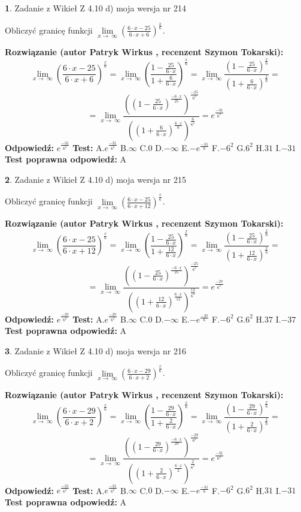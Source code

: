 \documentclass[12pt, a4paper]{article}
\theoremstyle{definition} %
\newtheorem{zad}{}
\newcommand{\zadStart}[1]{\begin{zad}#1\newline}
\newcommand{\zadStop}{\end{zad}}
\newcommand{\rozwStart}[2]{\noindent \textbf{Rozwiązanie (autor #1 , recenzent #2): }\newline}
\newcommand{\rozwStop}{\newline}
\newcommand{\odpStart}{\noindent \textbf{Odpowiedź:}\newline}
\newcommand{\odpStop}{\newline}
\newcommand{\testStart}{\noindent \textbf{Test:}\newline}
\newcommand{\testStop}{\newline}
\newcommand{\kluczStart}{\noindent \textbf{Test poprawna odpowiedź:}\newline}
\newcommand{\kluczStop}{\newline}
\begin{document}
\zadStart{Zadanie z Wikieł Z 4.10 d) moja wersja nr 214}


Obliczyć granicę funkcji  $\lim\limits_{x\to\ \infty}(\frac{6\cdot x-25}{6\cdot x+6})^{\frac{x}{6}}$.
\zadStop
\rozwStart{Patryk Wirkus}{Szymon Tokarski}
$$\lim\limits_{x\to\ \infty}(\frac{6\cdot x-25}{6\cdot x+6})^{\frac{x}{6}} = \lim\limits_{x\to\ \infty}(\frac{1-\frac{25}{6\cdot x}}{1+\frac{6}{6\cdot x}})^{\frac{x}{6}}=\lim\limits_{x\to\ \infty}\frac{(1-\frac{25}{6\cdot x})^{\frac{x}{6}}}{(1+\frac{6}{6\cdot x})^{\frac{x}{6}}}=$$
$$=\lim\limits_{x\to\ \infty}\frac{((1-\frac{25}{6\cdot x})^{\frac{-6\cdot x}{25}})^{\frac{-25}{6^{2}}}}{((1+\frac{6}{6\cdot x})^{\frac{6\cdot x}{6}})^{\frac{6}{6^{2}}}}=e^{\frac{-31}{6^{2}}}$$
\rozwStop
\odpStart
$e^{\frac{-31}{6^{2}}}$
\odpStop
\testStart
A.$e^{\frac{-31}{6^{2}}}$ B.$\infty$ C.$0$ D.$-\infty$ E.$-e^{\frac{-31}{6}}$
F.$-6^{2}$ G.$6^{2}$
H.$31$
I.$-31$
\testStop
\kluczStart
A
\kluczStop



\zadStart{Zadanie z Wikieł Z 4.10 d) moja wersja nr 215}


Obliczyć granicę funkcji  $\lim\limits_{x\to\ \infty}(\frac{6\cdot x-25}{6\cdot x+12})^{\frac{x}{6}}$.
\zadStop
\rozwStart{Patryk Wirkus}{Szymon Tokarski}
$$\lim\limits_{x\to\ \infty}(\frac{6\cdot x-25}{6\cdot x+12})^{\frac{x}{6}} = \lim\limits_{x\to\ \infty}(\frac{1-\frac{25}{6\cdot x}}{1+\frac{12}{6\cdot x}})^{\frac{x}{6}}=\lim\limits_{x\to\ \infty}\frac{(1-\frac{25}{6\cdot x})^{\frac{x}{6}}}{(1+\frac{12}{6\cdot x})^{\frac{x}{6}}}=$$
$$=\lim\limits_{x\to\ \infty}\frac{((1-\frac{25}{6\cdot x})^{\frac{-6\cdot x}{25}})^{\frac{-25}{6^{2}}}}{((1+\frac{12}{6\cdot x})^{\frac{6\cdot x}{12}})^{\frac{12}{6^{2}}}}=e^{\frac{-37}{6^{2}}}$$
\rozwStop
\odpStart
$e^{\frac{-37}{6^{2}}}$
\odpStop
\testStart
A.$e^{\frac{-37}{6^{2}}}$ B.$\infty$ C.$0$ D.$-\infty$ E.$-e^{\frac{-37}{6}}$
F.$-6^{2}$ G.$6^{2}$
H.$37$
I.$-37$
\testStop
\kluczStart
A
\kluczStop



\zadStart{Zadanie z Wikieł Z 4.10 d) moja wersja nr 216}


Obliczyć granicę funkcji  $\lim\limits_{x\to\ \infty}(\frac{6\cdot x-29}{6\cdot x+2})^{\frac{x}{6}}$.
\zadStop
\rozwStart{Patryk Wirkus}{Szymon Tokarski}
$$\lim\limits_{x\to\ \infty}(\frac{6\cdot x-29}{6\cdot x+2})^{\frac{x}{6}} = \lim\limits_{x\to\ \infty}(\frac{1-\frac{29}{6\cdot x}}{1+\frac{2}{6\cdot x}})^{\frac{x}{6}}=\lim\limits_{x\to\ \infty}\frac{(1-\frac{29}{6\cdot x})^{\frac{x}{6}}}{(1+\frac{2}{6\cdot x})^{\frac{x}{6}}}=$$
$$=\lim\limits_{x\to\ \infty}\frac{((1-\frac{29}{6\cdot x})^{\frac{-6\cdot x}{29}})^{\frac{-29}{6^{2}}}}{((1+\frac{2}{6\cdot x})^{\frac{6\cdot x}{2}})^{\frac{2}{6^{2}}}}=e^{\frac{-31}{6^{2}}}$$
\rozwStop
\odpStart
$e^{\frac{-31}{6^{2}}}$
\odpStop
\testStart
A.$e^{\frac{-31}{6^{2}}}$ B.$\infty$ C.$0$ D.$-\infty$ E.$-e^{\frac{-31}{6}}$
F.$-6^{2}$ G.$6^{2}$
H.$31$
I.$-31$
\testStop
\kluczStart
A
\kluczStop
\end{document}
